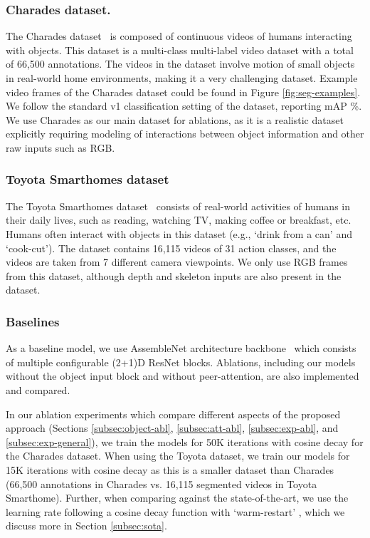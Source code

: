 \documentclass[runningheads]{llncs}
\begin{document}
\subsubsection{Charades dataset.} The Charades dataset~\cite{sigurdsson2018charadesego} is composed of continuous videos of humans interacting with objects. 
This dataset is a multi-class multi-label video dataset with a total of 66,500 annotations. The videos in the dataset involve motion of small objects in real-world home environments, making it a very challenging dataset. Example video frames of the Charades dataset could be found in Figure \ref{fig:seg-examples}. We follow the standard v1 classification setting of the dataset, reporting mAP \%. We use Charades as our main dataset for ablations, as it is a realistic dataset explicitly requiring modeling of interactions between object information and other raw inputs such as RGB.





\subsubsection{Toyota Smarthomes dataset} The Toyota Smarthomes dataset~\cite{das2019toyota} consists of real-world activities of humans in their daily lives, such as reading, watching TV, making coffee or breakfast, etc.  
Humans often interact with objects in this dataset (e.g., `drink from a can' and `cook-cut'). 
The dataset contains 16,115 videos of 31 action classes, and the videos are taken from 7 different camera viewpoints. We only use RGB frames from this dataset, although depth and skeleton inputs are also present in the dataset.



\subsubsection{Baselines}



As a baseline model, we use AssembleNet architecture backbone~\cite{ryoo2019assemblenet} which consists of multiple configurable (2+1)D ResNet blocks. 
Ablations, including our models without the object input block and without peer-attention, are also implemented and compared. 


In our ablation experiments which compare different aspects of the proposed approach 
(Sections \ref{subsec:object-abl}, \ref{subsec:att-abl}, \ref{subsec:exp-abl}, and \ref{subsec:exp-general}), we train the models for 50K iterations with cosine decay for the Charades dataset. When using the Toyota dataset, we train our models for 15K iterations with cosine decay as this is a smaller dataset than Charades (66,500 annotations in Charades vs. 16,115 segmented videos in Toyota Smarthome). Further, when comparing against the state-of-the-art, we use the learning rate following a cosine decay function with `warm-restart' \cite{loshchilov2017}, which we discuss more in Section \ref{subsec:sota}. 
\end{document}

